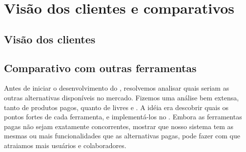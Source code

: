 \section{Visão dos clientes e comparativos}

\subsection{Visão dos clientes}


\subsection{Comparativo com outras ferramentas}

Antes de iniciar o desenvolvimento do \calopsita{}, resolvemos analisar quais seriam as outras alternativas disponíveis no mercado. Fizemos uma análise bem extensa, tanto de produtos pagos, quanto de livres e \opensource{}. A idéia era descobrir quais os pontos fortes de cada ferramenta, e implementá-los no \calopsita{}. Embora as ferramentas pagas não sejam exatamente concorrentes, mostrar que nosso sistema tem as mesmas ou mais funcionalidades que as alternativas pagas, pode fazer com que atraiamos mais usuários e colaboradores.

